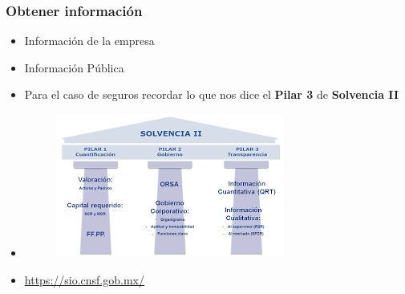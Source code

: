 \begin{frame}
    \frametitle{Obtener información}
    \begin{itemize}
        \item<1-> Información de la empresa
        \item<2-> Información Pública
        \item<3-> Para el caso de seguros recordar lo que nos dice el \textbf{Pilar 3} de \textbf{Solvencia II}
        \item<4->[]
            \begin{figure}[h!]
            \centering
                \includegraphics[scale=0.45]{Imagenes/02_Pilares.png}
            \label{fig:fig2}
            \end{figure} 
        \item<5-> \url{https://sio.cnsf.gob.mx/}
  \end{itemize}
\end{frame}